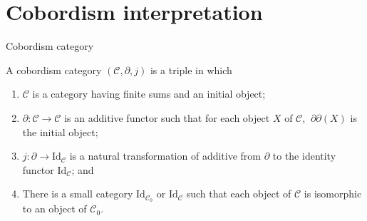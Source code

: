 \documentclass{beamer}
\theoremstyle{plain}
\newcommand{\Id}{\mathrm{Id}}
\begin{document}
\section{Cobordism interpretation}
\begin{frame}
	{\Large Cobordism category}
\begin{definition}\label{cobordism_category_defn}
	A \alert{cobordism category} $\left(\mathscr C, \partial, j\right)$ is a triple in which
	\begin{enumerate}
		\item [(a)] $\mathscr C$ is a category having finite sums and an initial object;
		\item[(b)] $\partial:  \mathscr C \to \mathscr C$ is an additive  functor such that for each object $X$ of $\mathscr C$, $~\partial \partial \left( X\right)$ is the initial object;
		\item[(c)] $j :\partial \to \Id_{\mathscr C}$ is a natural transformation of additive from $\partial$ to the identity functor $\Id_{\mathscr C}$; and 
		\item[(d)] There is a small category $\Id_{\mathscr C_0}$ or $\Id_{\mathscr C}$ such that each object of $\mathscr C$ is isomorphic  to an object of $\mathscr C_0$.
	\end{enumerate} 
\end{definition}
\end{frame}
\end{document}
